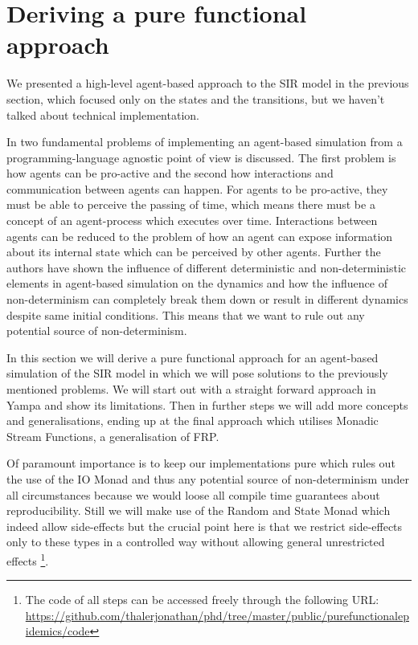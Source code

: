\section{Deriving a pure functional approach}
\label{sec:functional_approach}

We presented a high-level agent-based approach to the SIR model in the previous section, which focused only on the states and the transitions, but we haven't talked about technical implementation. 

In \cite{thaler_art_2017} two fundamental problems of implementing an agent-based simulation from a programming-language agnostic point of view is discussed. The first problem is how agents can be pro-active and the second how interactions and communication between agents can happen. For agents to be pro-active, they must be able to perceive the passing of time, which means there must be a concept of an agent-process which executes over time. Interactions between agents can be reduced to the problem of how an agent can expose information about its internal state which can be perceived by other agents. Further the authors have shown the influence of different deterministic and non-deterministic elements in agent-based simulation on the dynamics and how the influence of non-determinism can completely break them down or result in different dynamics despite same initial conditions. This means that we want to rule out any potential source of non-determinism.

In this section we will derive a pure functional approach for an agent-based simulation of the SIR model in which we will pose solutions to the previously mentioned problems. We will start out with a straight forward approach in Yampa and show its limitations. Then in further steps we will add more concepts and generalisations, ending up at the final approach which utilises Monadic Stream Functions, a generalisation of FRP.

Of paramount importance is to keep our implementations pure which rules out the use of the IO Monad and thus any potential source of non-determinism under all circumstances because we would loose all compile time guarantees about reproducibility. Still we will make use of the Random and State Monad which indeed allow side-effects but the crucial point here is that we restrict side-effects only to these types in a controlled way without allowing general unrestricted effects
\footnote{The code of all steps can be accessed freely through the following URL: \url{https://github.com/thalerjonathan/phd/tree/master/public/purefunctionalepidemics/code}}.

